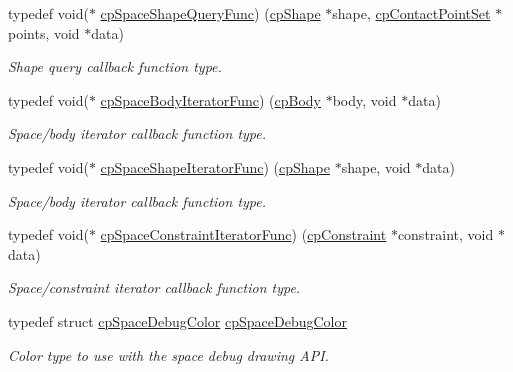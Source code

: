 \begin{DoxyCompactItemize}
typedef void($\ast$ \hyperlink{group__cpSpace_gab124952dd71dea36688f6ff6ff8bdcb2}{cp\+Space\+Shape\+Query\+Func}) (\hyperlink{structcpShape}{cp\+Shape} $\ast$shape, \hyperlink{structcpContactPointSet}{cp\+Contact\+Point\+Set} $\ast$points, void $\ast$data)
\begin{DoxyCompactList}\small\item\em Shape query callback function type. \end{DoxyCompactList}\item 
\mbox{\label{group__cpSpace_ga2870b1128c5bfe79cb261d269abdea64}} 
typedef void($\ast$ \hyperlink{group__cpSpace_ga2870b1128c5bfe79cb261d269abdea64}{cp\+Space\+Body\+Iterator\+Func}) (\hyperlink{structcpBody}{cp\+Body} $\ast$body, void $\ast$data)
\begin{DoxyCompactList}\small\item\em Space/body iterator callback function type. \end{DoxyCompactList}\item 
\mbox{\label{group__cpSpace_gafae017c9a8a7c082032035bf165e4ec9}} 
typedef void($\ast$ \hyperlink{group__cpSpace_gafae017c9a8a7c082032035bf165e4ec9}{cp\+Space\+Shape\+Iterator\+Func}) (\hyperlink{structcpShape}{cp\+Shape} $\ast$shape, void $\ast$data)
\begin{DoxyCompactList}\small\item\em Space/body iterator callback function type. \end{DoxyCompactList}\item 
\mbox{\label{group__cpSpace_ga0bf20ed2411342352dc43b71c60649c1}} 
typedef void($\ast$ \hyperlink{group__cpSpace_ga0bf20ed2411342352dc43b71c60649c1}{cp\+Space\+Constraint\+Iterator\+Func}) (\hyperlink{structcpConstraint}{cp\+Constraint} $\ast$constraint, void $\ast$data)
\begin{DoxyCompactList}\small\item\em Space/constraint iterator callback function type. \end{DoxyCompactList}\item 
\mbox{\label{group__cpSpace_gafc46fcefca8c28112ca8245eef00bae7}} 
typedef struct \hyperlink{structcpSpaceDebugColor}{cp\+Space\+Debug\+Color} \hyperlink{group__cpSpace_gafc46fcefca8c28112ca8245eef00bae7}{cp\+Space\+Debug\+Color}
\begin{DoxyCompactList}\small\item\em Color type to use with the space debug drawing A\+PI. \end{DoxyCompactList}\item 

\end{DoxyCompactItemize}

